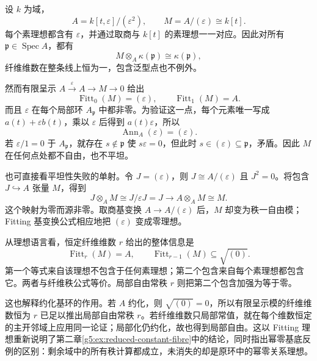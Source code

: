 \begin{example}\label{g5:exm:fitting-nilpotent-line}
	设 \(k\) 为域，
	\[
		A=k[t,\varepsilon]/(\varepsilon^2),
		\qquad M=A/(\varepsilon)\cong k[t].
	\]
	每个素理想都含有 \(\varepsilon\)，并通过取商与 \(k[t]\) 的素理想一一对应。因此对所有 \(\mathfrak p\in\operatorname{Spec}A\)，都有
	\[
		M\otimes_A\kappa(\mathfrak p)\cong\kappa(\mathfrak p),
	\]
	纤维维数在整条线上恒为一，包含泛型点也不例外。

	然而有限呈示 \(A\xrightarrow{\varepsilon}A\to M\to0\) 给出
	\[
		\operatorname{Fitt}_0(M)=(\varepsilon),
		\qquad\operatorname{Fitt}_1(M)=A.
	\]
	而且 \(\varepsilon\) 在每个局部环 \(A_{\mathfrak p}\) 中都非零。为验证这一点，每个元素唯一写成 \(a(t)+\varepsilon b(t)\)，乘以 \(\varepsilon\) 后得到 \(a(t)\varepsilon\)，所以
	\[
		\operatorname{Ann}_A(\varepsilon)=(\varepsilon).
	\]
	若 \(\varepsilon/1=0\) 于 \(A_{\mathfrak p}\)，就存在 \(s\notin\mathfrak p\) 使 \(s\varepsilon=0\)，但此时 \(s\in(\varepsilon)\subseteq\mathfrak p\)，矛盾。因此 \(M\) 在任何点处都不自由，也不平坦。

	也可直接看平坦性失败的单射。令 \(J=(\varepsilon)\)，则 \(J\cong A/(\varepsilon)\) 且 \(J^2=0\)。将包含 \(J\hookrightarrow A\) 张量 \(M\)，得到
	\[
		J\otimes_A M\cong J/\varepsilon J=J
		\longrightarrow A\otimes_A M\cong M.
	\]
	这个映射为零而源非零。取商基变换 \(A\to A/(\varepsilon)\) 后，\(M\) 却变为秩一自由模；Fitting 基变换公式相应地把 \((\varepsilon)\) 变成零理想。
\end{example}

从理想语言看，恒定纤维维数 \(r\) 给出的整体信息是
\[
	\operatorname{Fitt}_r(M)=A,
	\qquad
	\operatorname{Fitt}_{r-1}(M)\subseteq\sqrt{(0)}.
\]
第一个等式来自该理想不包含于任何素理想；第二个包含来自每个素理想都包含它。两者与纤维秩公式等价。局部自由常秩 \(r\) 则把第二个包含加强为等于零。

\ProseParagraphBreak

这也解释约化基环的作用。若 \(A\) 约化，则 \(\sqrt{(0)}=0\)，所以有限呈示模的纤维维数恒为 \(r\) 已足以推出局部自由常秩 \(r\)。若纤维维数只局部常值，就在每个维数恒定的主开邻域上应用同一论证；局部化仍约化，故也得到局部自由。这以 Fitting 理想重新说明了第二章\cref{g5:ex:reduced-constant-fibre}中的结论，同时指出幂零基底反例的区别：剩余域中的所有秩计算都成立，未消失的却是原环中的幂零关系理想。
